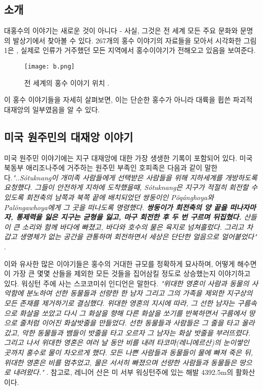 \documentclass[10pt,twocolumn,letterpaper]{article}
\begin{document}
\begin{개요}
\section{소개}

대홍수의 이야기는 새로운 것이 아니다 - 사실, 그것은 전 세계 모든 주요 문화와 문명의 발상기에서 찾아볼 수 있다. 267개의 홍수 이야기의 자료들을 모아서 시각화한 그림 1은 \cite{3}, 실제로  인류가 거주했던 모든 지역에서 홍수이야기가 전해오고 있음을 보여준다.

\begin{figure}[h]
\begin{center}
   \texttt{[image: b.png]}
\end{center}
   \caption{전 세계의 홍수 이야기 위치 \cite{3}.}
\label{fig:1}
\label{fig:onecol}
\end{figure}

이 홍수 이야기들을 자세히 살펴보면, 이는 단순한 홍수가 아니라 대륙을 휩쓴 파괴적 대재앙의 일부였음을 알 수 있다.

\subsection{미국 원주민의 대재앙 이야기}

미국 원주민 이야기에는 지구 대재앙에 대한 가장 생생한 기록이 포함되어 있다. 미국 북동부 애리조나주에 거주하는 원주민 부족인 호피족은 다음과 같이 말한다.\textit{"..Sótuknang이 개미족 사람들에게 선택받은 사람들을 위해 지하세계를 개방하도록 요청했다. 그들이 안전하게 지하에 도착했을때, Sótuknang은 지구가 적절히 회전할 수 있도록 회전축의 남쪽과 북쪽 끝에 배치되었던 쌍둥이인 Pöqánghoya와 Palöngawhoya에게 그 곳을 떠나도록 명령했다. \textbf{쌍둥이가 회전축의 양 끝을 떠나자마자, 통제력을 잃은 지구는 균형을 잃고,  마구 회전한 후 두 번 구르며 뒤집혔다.} 산들이 큰 소리와 함께 바다에 빠졌고, 바다와 호수의 물은 육지로 넘쳐흘렀다. 그리고 차갑고 생명체가 없는 공간을 관통하며 회전하면서 세상은 단단한 얼음으로 얼어붙었다"} \cite{4}.

이와 유사한 많은 이야기들은 홍수의 거대한 규모를 정확하게 묘사하며, 어떻게 해수면이  가장 큰 몇몇 산들을 제외한 모든 것들을 집어삼킬 정도로  상승했는지  이야기하고 있다. 워싱턴 주에 사는 스코코미쉬 인디언은 말한다. \textit{"위대한 영혼이 사람과 동물의 사악함에 분노하여 선한 동물들과 선량한 한 남자 그리고 그의 가족을 제외한 지구상의 모든 존재를 제거하기로 결심했다. 위대한 영혼의 지시에 따라, 그 선한 남자는 구름속으로 화살을 쏘았고 다시 그 화살을 향해 다른 화살을 쏘기를 반복하면서 구름에서 땅으로 줄처럼 이어진 화살밧줄을 만들었다. 선한 동물들과 사람들은 그 줄을 타고 올라갔고, 악한 동물들과 뱀들이 밧줄을 타고 오르자 그 남자는 화살 밧줄을 부러뜨렸다. 그리고 나서 위대한 영혼은 여러 날 동안 비를 내려 타코마(레니에르산)의 눈이쌓인 곳까지 홍수로 물이 차오르게 했다. 모든 나쁜 사람들과 동물들이 물에 빠져 죽은 뒤, 위대한 영혼은 비를 멈추었고, 물은 서서히 빠졌으며 선량한 사람들과 동물들은 땅으로 내려왔다."} \cite{3}. 참고로, 레니어 산은 미 서부 워싱턴주에 있는 해발 4392.5m의 활화산이다. 


\end{개요}
\end{document}
